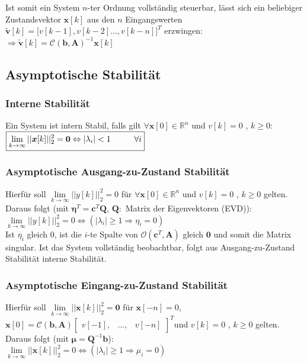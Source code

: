 \documentclass[a4paper,landscape,6pt]{article}
\newcommand{\ma}[1]{\ensuremath{\boldsymbol {#1}}}								%
\newcommand{\mat}[1]{\ensuremath{\begin{bmatrix} #1 \end{bmatrix}}}				%
\renewcommand{\vec}[1]{\ensuremath{\boldsymbol {#1}}}							%
\begin{document}
\begin{multicols}{3}
Ist somit ein System $n$-ter Ordnung vollständig steuerbar, lässt sich ein beliebiger Zustandsvektor $\vec x[k]$ aus den $n$ Eingangswerten $\vec{\tilde v}[k] = \big[ v[k-1], v[k-2] \dots, v[k-n] \big]^T$ erzwingen:
$\Rightarrow \vec{\tilde v}[k] = \ma{\mathcal{C}}(\vec b, \ma A)^{-1} \vec x[k]$
\subsection*{Asymptotische Stabilität}
\subsubsection*{Interne Stabilität}
Ein System ist intern Stabil, falls gilt $\forall \vec x[0] \in \mathbb{R}^n$ und $v[k] = 0$ , $k\ge 0$: $\boxed{\lim\limits_{k \rightarrow \infty} ||\vec x[k]||_2^2 = \vec 0 \Leftrightarrow |\lambda_i| < 1 \tab  \forall i}$
\subsubsection*{Asymptotische Ausgang-zu-Zustand Stabilität}
Hierfür soll $\lim\limits_{k \rightarrow \infty} ||y[k]||_2^2 = 0$ für $\forall \vec x[0] \in \mathbb{R}^n$ und $v[k] = 0$ , $k\ge 0$ gelten. Daraus folgt (mit $\vec \eta^T = \vec c^T \ma Q$, $\ma Q:$ Matrix der Eigenvektoren (EVD)):\\

\tab $\boxed{\lim\limits_{k \rightarrow \infty} ||y[k]||_2^2 = 0 \Leftrightarrow (|\lambda_i| \ge 1 \Rightarrow \eta_i = 0)}$\\

Ist $\eta_i$ gleich 0, ist die $i$-te Spalte von $\ma{\mathcal{O}}(\vec c^T, \ma A)$ gleich $\vec 0$ und somit die Matrix singular.
Ist das System vollständig beobachtbar, folgt aus Ausgang-zu-Zustand Stabilität interne Stabilität.
\subsubsection*{Asymptotische Eingang-zu-Zustand Stabilität}
Hierfür soll $\lim\limits_{k \rightarrow \infty} ||\vec x[k]||_2^2 = \vec 0$ für $\vec x[-n]=0$, $\vec x[0] = \ma{\mathcal{C}}(\vec b, \ma A) \mat{v[-1], & \dots ,& v[-n]}^T$und $v[k] = 0$ , $k\ge 0$ gelten. Daraus folgt (mit $\vec \mu = \ma Q^{-1} \vec b$):\\
\tab $\boxed{\lim\limits_{k \rightarrow \infty} ||\vec x[k]||_2^2 = 0 \Leftrightarrow (|\lambda_i| \ge 1 \Rightarrow \mu_i = 0)}$\\


\end{multicols}
\end{document}

